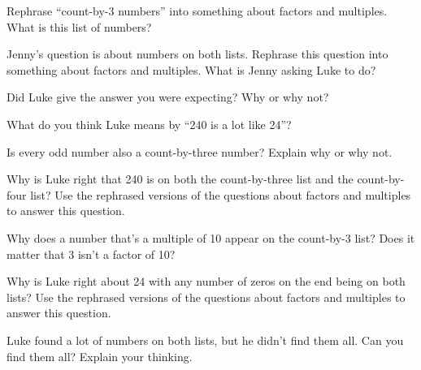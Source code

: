 \documentclass[nooutcomes,noauthor,handout]{ximera}
\begin{document}
\begin{problem} Rephrase ``count-by-3 numbers'' into something about factors and multiples. What is this list of numbers?
\end{problem}


\begin{problem} Jenny’s question is about numbers on both lists. Rephrase this question into something about factors and multiples. What is Jenny asking Luke to do?
\end{problem}

\begin{problem} Did Luke give the answer you were expecting? Why or why not?
\end{problem}

\begin{problem} What do you think Luke means by ``240 is a lot like 24''?
\end{problem}

\begin{problem}
Is every odd number also a count-by-three number? Explain why or why not.
\end{problem}


\begin{problem} Why is Luke right that 240 is on both the count-by-three list and the count-by-four list? Use the rephrased versions of the questions about factors and multiples to answer this question.
\end{problem}

\begin{problem} Why does a number that’s a multiple of 10 appear on the count-by-3 list? Does it matter that 3 isn't a factor of 10?
\end{problem}

\begin{problem} Why is Luke right about 24 with any number of zeros on the end being on both lists? Use the rephrased versions of the questions about factors and multiples to answer this question.
\end{problem}

\begin{problem}
Luke found a lot of numbers on both lists, but he didn't find them all. Can you find them all? Explain your thinking.
\end{problem}

\end{document}
